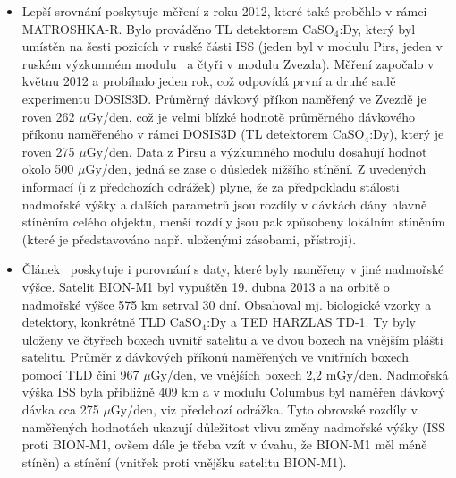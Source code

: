 \begin{itemize}
není \cite{passDetectors}. (Poznámka: lze srovnat obr. \ref{fig:dosis_passDetectors_LETspektrum} s obr. \ref{fig:stineni} -- rozdíl ve spektrech je způsoben tím, že první obr. představuje diferenciální spektrum, zatímco druhý zobrazuje integrální spektrum.) 
\begin{figure}[h]
  \centering
  \texttt{[image: dosis\_LETspektrum\_passDetectors.jpg]}
  \caption{$\LET$ spektra z dat naměřených v modulu Pirs (Piers-1) a v modulu Zvezda (SM) v příslušných SPD.~\cite{passDetectors}}
  \label{fig:dosis_passDetectors_LETspektrum}
\end{figure}
\item Lepší srovnání poskytuje měření z roku 2012, které také proběhlo v rámci MATROSHKA-R. Bylo prováděno TL detektorem CaSO$_4$:Dy, který byl umístěn na šesti pozicích v ruské části ISS (jeden byl v modulu Pirs, jeden v ruském výzkumném modulu~\cite{researchModule} a čtyři v modulu Zvezda). Měření započalo v květnu 2012 a probíhalo jeden rok, což odpovídá první a druhé sadě experimentu DOSIS3D. Průměrný dávkový příkon naměřený ve Zvezdě je roven 262 $\mu$Gy/den, což je velmi blízké hodnotě průměrného dávkového příkonu naměřeného v rámci DOSIS3D (TL detektorem CaSO$_4$:Dy), který je roven 275 $\mu$Gy/den. Data z Pirsu a výzkumného modulu dosahují hodnot okolo 500 $\mu$Gy/den, jedná se zase o důsledek nižšího stínění. Z uvedených informací (i z předchozích odrážek) plyne, že za předpokladu
  stálosti nadmořské výšky a dalších parametrů jsou rozdíly v dávkách dány hlavně stíněním celého objektu, menší rozdíly jsou pak způsobeny lokálním stíněním (které je představováno např. uloženými zásobami, přístroji).~\cite{ambrozova_dvaExperimenty}
  \item Článek~\cite{ambrozova_dvaExperimenty} poskytuje i porovnání s daty, které byly naměřeny v jiné nadmořské výšce. Satelit BION-M1 byl vypuštěn 19. dubna 2013 a na orbitě o nadmořské výšce 575 km setrval 30 dní. Obsahoval mj. biologické vzorky a detektory, konkrétně TLD CaSO$_4$:Dy a TED HARZLAS TD-1. Ty byly uloženy ve čtyřech boxech uvnitř satelitu a ve dvou boxech na vnějším plášti satelitu. Průměr z dávkových příkonů naměřených ve vnitřních boxech pomocí TLD činí 967 $\mu$Gy/den, ve vnějších boxech 2,2 mGy/den. Nadmořská výška ISS byla přibližně 409 km a v modulu Columbus byl naměřen dávkový dávka cca 275 $\mu$Gy/den, viz předchozí odrážka. Tyto obrovské rozdíly v naměřených hodnotách ukazují důležitost vlivu změny nadmořské výšky (ISS proti BION-M1, ovšem dále je třeba vzít v úvahu, že BION-M1 měl méně
	stíněn) a stínění (vnitřek proti vnějšku satelitu BION-M1).

\end{itemize}
